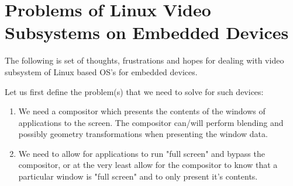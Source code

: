 \documentclass[a4paper,11pt]{article}
\begin{document}
\newpage

\renewcommand{\contentsname}{Table of Contents}
{
\singlespacing
\tableofcontents
}

\setlength{\parindent}{0pt}

\newpage

\section{Problems of Linux Video Subsystems on Embedded Devices}
\begin{indenter}{2cm}

The following is set of thoughts, frustrations and hopes for dealing with
video subsystem of Linux based OS's for embedded devices.

Let us first define the problem(s) that we need to solve for such devices:

\begin{enumerate}
\item We need a compositor which presents the contents of the windows of applications
to the screen. The compositor can/will perform blending and possibly geometry
transformations when presenting the window data.
\item We need to allow for applications to run "full screen" and bypass the
compositor, or at the very least allow for the compositor to know that a
particular window is "full screen" and to only present it's contents.
\end{enumerate}

\end{indenter}
\end{document}
